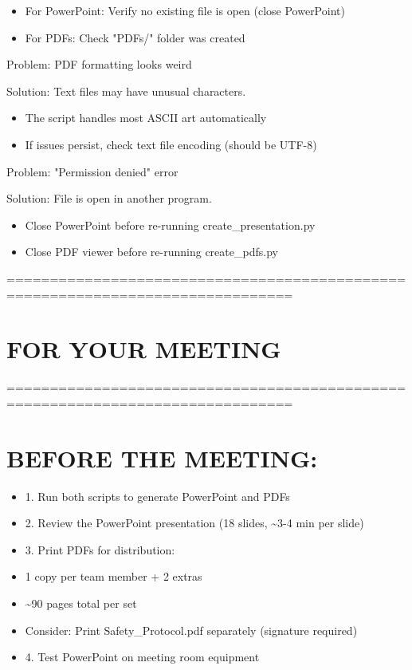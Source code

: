 \documentclass[11pt,letterpaper]{article}
\begin{document}
\begin{itemize}
  \item For PowerPoint: Verify no existing file is open (close PowerPoint)
  \item For PDFs: Check "PDFs/" folder was created
\end{itemize}

Problem: PDF formatting looks weird\par

Solution: Text files may have unusual characters.\par

\begin{itemize}
  \item The script handles most ASCII art automatically
  \item If issues persist, check text file encoding (should be UTF-8)
\end{itemize}

Problem: "Permission denied" error\par

Solution: File is open in another program.\par

\begin{itemize}
  \item Close PowerPoint before re-running create\_presentation.py
  \item Close PDF viewer before re-running create\_pdfs.py
\end{itemize}

===============================================================================\par

\section{FOR YOUR MEETING}

===============================================================================\par

\section{BEFORE THE MEETING:}

\begin{itemize}
  \item 1. Run both scripts to generate PowerPoint and PDFs
  \item 2. Review the PowerPoint presentation (18 slides, \textasciitilde{}3-4 min per slide)
  \item 3. Print PDFs for distribution:
  \item 1 copy per team member + 2 extras
  \item \textasciitilde{}90 pages total per set
  \item Consider: Print Safety\_Protocol.pdf separately (signature required)
  \item 4. Test PowerPoint on meeting room equipment
\end{itemize}
\end{document}

